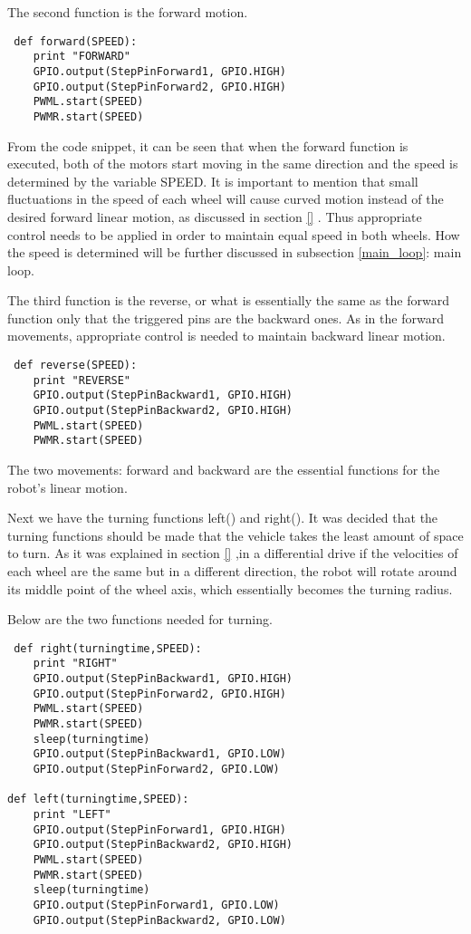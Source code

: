 The second function is the forward motion.

\begin{lstlisting}
 def forward(SPEED):
	print "FORWARD"
	GPIO.output(StepPinForward1, GPIO.HIGH)
	GPIO.output(StepPinForward2, GPIO.HIGH)
	PWML.start(SPEED)
	PWMR.start(SPEED)
\end{lstlisting}

From the code snippet, it can be seen that when the forward function is executed, both of the motors start moving in the same direction and the speed is determined by the variable SPEED. It is important to mention that small fluctuations in the speed of each wheel will cause curved motion instead of the desired forward linear motion, as discussed in section \ref{} . Thus appropriate control needs to be applied in order to maintain equal speed in both wheels. 
How the speed is determined will be further discussed in subsection \ref{main_loop}: main loop.

The third function is the reverse, or what is essentially the same as the forward function only that the triggered pins are the backward ones. As in the forward movements, appropriate control is needed to maintain backward linear motion.

\begin{lstlisting}
 def reverse(SPEED):
	print "REVERSE"
	GPIO.output(StepPinBackward1, GPIO.HIGH)
	GPIO.output(StepPinBackward2, GPIO.HIGH)
	PWML.start(SPEED)
	PWMR.start(SPEED)
\end{lstlisting}

The two movements: forward and backward are the essential functions for the robot's linear motion.

Next we have the turning functions left() and right().
It was decided that the turning functions should be made that the vehicle takes the least amount of space to turn.
As it was explained in section \ref{} ,in a differential drive if the velocities of each wheel are the same but in a different direction, the robot will rotate around its middle point of the wheel axis, which essentially becomes the turning radius.

Below are the two functions needed for turning.

\begin{lstlisting}
 def right(turningtime,SPEED):
	print "RIGHT"
	GPIO.output(StepPinBackward1, GPIO.HIGH)
	GPIO.output(StepPinForward2, GPIO.HIGH)
	PWML.start(SPEED)
	PWMR.start(SPEED)
	sleep(turningtime)
	GPIO.output(StepPinBackward1, GPIO.LOW)
	GPIO.output(StepPinForward2, GPIO.LOW)

def left(turningtime,SPEED):
	print "LEFT"
	GPIO.output(StepPinForward1, GPIO.HIGH)
	GPIO.output(StepPinBackward2, GPIO.HIGH)
	PWML.start(SPEED)
	PWMR.start(SPEED)
	sleep(turningtime)
	GPIO.output(StepPinForward1, GPIO.LOW)
	GPIO.output(StepPinBackward2, GPIO.LOW)
\end{lstlisting}

